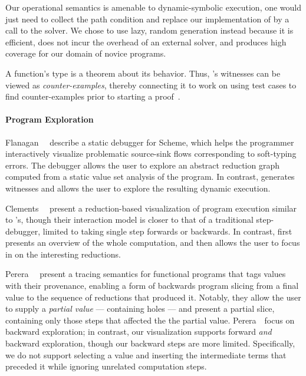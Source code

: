 Our operational semantics is amenable to dynamic-symbolic execution, one
would just need to collect the path condition and replace our
implementation of \gensym by a call to the solver. We chose to use lazy,
random generation instead because it is efficient, does not incur
the overhead of an external solver, and produces high coverage for our
domain of novice programs.

A function's type is a theorem about its behavior.
Thus, \toolname's witnesses can be viewed as \emph{counter-examples},
thereby connecting it to work on using test cases to find
counter-examples prior to starting a proof~\cite{ACL2Testing, Nguyen2015-oo, Seidel15}.



\paragraph{Program Exploration}

Flanagan~\etal~ describe a static debugger for Scheme, which helps
the programmer interactively visualize problematic source-sink flows
corresponding to soft-typing errors. The debugger allows the user to explore
an abstract reduction graph computed from a static value set analysis of
the program. In contrast, \toolname generates witnesses and allows the user
to explore the resulting dynamic execution.

Clements~\etal~ present a reduction-based
visualization of program execution similar to \toolname's, though their
interaction model is closer to that of a traditional step-debugger,
limited to taking single step forwards or backwards. In contrast,
\toolname first presents an overview of the whole computation, and then
allows the user to focus in on the interesting reductions.

Perera~\etal~ present a tracing semantics
for functional programs that tags values with their provenance, enabling
a form of backwards program slicing from a final value to the sequence
of reductions that produced it. Notably, they allow the user to supply a
\emph{partial value} --- containing holes --- and present a partial slice,
containing only those steps that affected the the partial value.
Perera~\etal\ focus on backward exploration; in contrast, our
visualization supports forward \emph{and} backward exploration, though
our backward steps are more limited.
%
Specifically, we do not support selecting a value and inserting the
intermediate terms that preceded it while ignoring unrelated computation
steps. %


